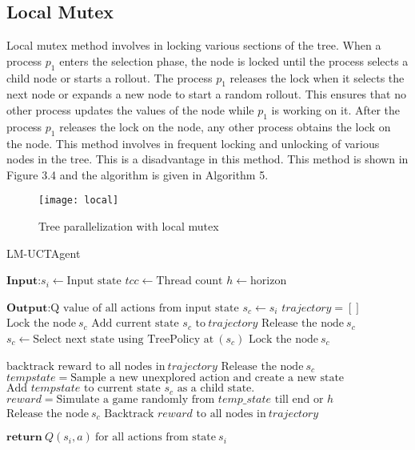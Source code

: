 \documentclass[double,12pt]{beavtex}
\begin{document}
\subsection{Local Mutex}
Local mutex method involves in locking various sections of the tree. When a process $p_1$ enters the selection phase, the node is locked until the process selects a child node or starts a rollout. The process $p_1$ releases the lock when it selects the next node or expands a new node to start a random rollout. This ensures that no other process updates the values of the node while $p_1$ is working on it. After the process $p_1$ releases the lock on the node, any other process obtains the lock on the node. This method involves in frequent locking and unlocking of various nodes in the tree. This is a disadvantage in this method. This method is shown in Figure 3.4 and the algorithm is given in Algorithm 5.

\begin{figure}[h!]
\centering
\texttt{[image: local]}
\caption{Tree parallelization with local mutex}
\end{figure}

\begin{algorithm}
	\caption{LM-UCTAgent}
	\label{alg:smartmeter}
	\begin{algorithmic}[1]
		\Statex $\textbf{Input:}   s_i \leftarrow \text{Input state}$
		\Statex $tcc\leftarrow \text{Thread count}$ 
		\Statex $h\leftarrow \text{horizon}$

		\Statex $\textbf{Output:}  \text{Q value of all actions from input state}$
			\State $s_c \leftarrow s_i$
			\State $trajectory = []$
			\State $\text{Lock the node}~s_c$
				\State $\text{Add current state $s_c$ to}~trajectory$
				\State $\text{Release the node}~s_c$
				\State $s_c \leftarrow \text{Select next state using TreePolicy at}~(s_c)$
				\State $\text{Lock the node}~s_c$
			\EndWhile

				\State $\text{backtrack reward to all nodes in}~trajectory$
				\State $\text{Release the node}~s_c$
			\Else
				\State $tempstate = \text{Sample a new unexplored action and create a new state}$
				\State $\text{Add $tempstate$ to current state $s_c$ as a child state.}$
				\State $reward = \text{Simulate a game randomly from $temp\_state$ till end or $h$}$
				\State $\text{Release the node}~s_c$
				\State $\text{Backtrack $reward$ to all nodes in}~trajectory$
			\EndIf
		\EndFor

		\Statex $\textbf{return}~Q(s_i,a)~\text{for all actions from state}~s_i$
	\end{algorithmic}
\end{algorithm}
\end{document}
